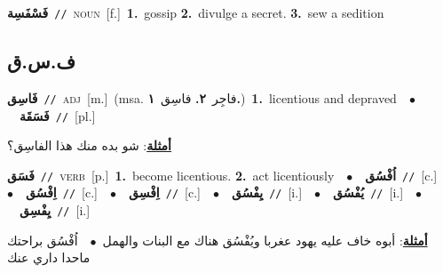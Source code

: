 \documentclass[10pt,a4paper,twoside]{article} %
\begin{document}
\begin{multicols}{2}
{\setlength\topsep{0pt}\textbf{\foreignlanguage{arabic}{فَسْفَسِة}}\ {\color{gray}\texttt{//}\color{black}}\ \textsc{noun}\ [f.]\ \textbf{1.}~gossip  \textbf{2.}~divulge a secret.  \textbf{3.}~sew a sedition\ } \vspace{2mm}

\vspace{-3mm}
\subsection*{\color{blue}\foreignlanguage{arabic}{ف.س.ق}\color{blue}{}} 

{\setlength\topsep{0pt}\textbf{\foreignlanguage{arabic}{فَاسِق}}\ {\color{gray}\texttt{//}\color{black}}\ \textsc{adj}\ [m.]\ \color{gray}(msa. \foreignlanguage{arabic}{فاجِر}~\foreignlanguage{arabic}{\textbf{٢.}}  \foreignlanguage{arabic}{فاسِق}~\foreignlanguage{arabic}{\textbf{١.}})\color{black}\ \textbf{1.}~licentious and depraved\ \ $\bullet$\ \ \setlength\topsep{0pt}\textbf{\foreignlanguage{arabic}{فَسَقَة}}\ {\color{gray}\texttt{//}\color{black}}\ [pl.]\  \begin{flushright}\color{gray}\foreignlanguage{arabic}{\textbf{\underline{\foreignlanguage{arabic}{أمثلة}}}: شو بده منك هذا الفاسِق؟}\end{flushright}\color{black}} \vspace{2mm}

{\setlength\topsep{0pt}\textbf{\foreignlanguage{arabic}{فَسَق}}\ {\color{gray}\texttt{//}\color{black}}\ \textsc{verb}\ [p.]\ \textbf{1.}~become licentious.  \textbf{2.}~act licentiously\ \ $\bullet$\ \ \setlength\topsep{0pt}\textbf{\foreignlanguage{arabic}{اُفْسُق}}\ {\color{gray}\texttt{//}\color{black}}\ [c.]\ \ $\bullet$\ \ \setlength\topsep{0pt}\textbf{\foreignlanguage{arabic}{اِفْسُق}}\ {\color{gray}\texttt{//}\color{black}}\ [c.]\ \ $\bullet$\ \ \setlength\topsep{0pt}\textbf{\foreignlanguage{arabic}{اِفْسِق}}\ {\color{gray}\texttt{//}\color{black}}\ [c.]\ \ $\bullet$\ \ \setlength\topsep{0pt}\textbf{\foreignlanguage{arabic}{يِفْسُق}}\ {\color{gray}\texttt{//}\color{black}}\ [i.]\ \ $\bullet$\ \ \setlength\topsep{0pt}\textbf{\foreignlanguage{arabic}{يُفْسُق}}\ {\color{gray}\texttt{//}\color{black}}\ [i.]\ \ $\bullet$\ \ \setlength\topsep{0pt}\textbf{\foreignlanguage{arabic}{يِفْسِق}}\ {\color{gray}\texttt{//}\color{black}}\ [i.]\  \begin{flushright}\color{gray}\foreignlanguage{arabic}{\textbf{\underline{\foreignlanguage{arabic}{أمثلة}}}: أبوه خاف عليه يهود عغربا ويُفْسُق هناك مع البنات والهمل\ $\bullet$\ \  اُفْسُق براحتك ماحدا داري عنك}\end{flushright}\color{black}} \vspace{2mm}


\end{multicols}
\end{document}
